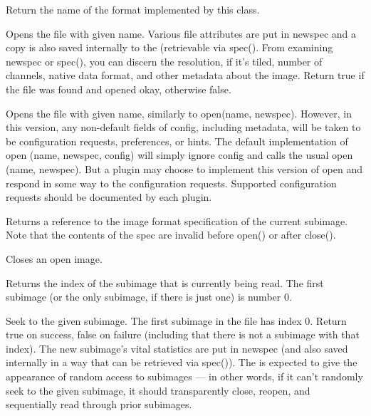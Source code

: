 Return the name of the format implemented by this class.
\apiend

Opens the file with given name.  Various file attributes are put in
{\kw newspec} and a copy is also saved internally to the
\ImageInput (retrievable via {\kw spec()}.  From examining
{\kw newspec} or {\kw spec()}, you can discern the resolution, if it's
tiled, number of channels, native data format, and other metadata about
the image.  Return {\kw true} if the file was found and opened okay,
otherwise {\kw false}.
\apiend


Opens the file with given name, similarly to {\cf open(name, newspec)}.
However, in this version, any non-default fields of {\cf config},
including metadata, will be taken to be configuration requests,
preferences, or hints.  The default implementation of 
{\cf open (name, newspec, config)} will simply ignore {\cf config} and
calls the usual {\cf open (name, newspec)}.  But a plugin may choose to
implement this version of {\cf open} and respond in some way to the
configuration requests.  Supported configuration requests should be
documented by each plugin.
\apiend

Returns a reference to the image format specification of the
current subimage.  Note that the contents of the spec are
invalid before {\kw open()} or after {\kw close()}.
\apiend

Closes an open image.
\apiend


Returns the index of the subimage that is currently being read.
The first subimage (or the only subimage, if there is just one) is
number 0.
\apiend


Seek to the given subimage.  The first subimage in the file has index 0.
Return {\kw true} on success, {\kw false} on failure (including that
there is not a subimage with that index).  The new subimage's vital
statistics are put in {\kw newspec} (and also saved internally in a way
that can be retrieved via {\kw spec()}).  The \ImageInput is
expected to give the appearance of random access to subimages --- in
other words, if it can't randomly seek to the given subimage, it should
transparently close, reopen, and sequentially read through prior
subimages.
\apiend

